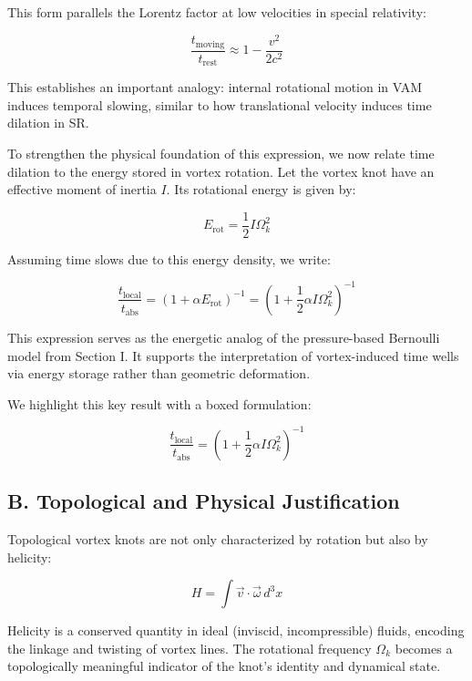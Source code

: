 This form parallels the Lorentz factor at low velocities in special relativity:

\begin{equation}
\frac{t_{\text{moving}}}{t_{\text{rest}}} \approx 1 - \frac{v^2}{2c^2}
\end{equation}

This establishes an important analogy: internal rotational motion in VAM induces temporal slowing, similar to how translational velocity induces time dilation in SR.

To strengthen the physical foundation of this expression, we now relate time dilation to the energy stored in vortex rotation. Let the vortex knot have an effective moment of inertia $I$. Its rotational energy is given by:

\begin{equation}
E_{\text{rot}} = \frac{1}{2} I \Omega_k^2
\end{equation}

Assuming time slows due to this energy density, we write:

\begin{equation}
\frac{t_{\text{local}}}{t_{\text{abs}}} = \left(1 + \alpha E_{\text{rot}} \right)^{-1} = \left(1 + \frac{1}{2} \alpha I \Omega_k^2 \right)^{-1}
\end{equation}

This expression serves as the energetic analog of the pressure-based Bernoulli model from Section I. It supports the interpretation of vortex-induced time wells via energy storage rather than geometric deformation.

We highlight this key result with a boxed formulation:

\begin{equation}
\boxed{\frac{t_{\text{local}}}{t_{\text{abs}}} = \left(1 + \frac{1}{2} \alpha I \Omega_k^2 \right)^{-1}}
\end{equation}

\subsection*{B. Topological and Physical Justification}

Topological vortex knots are not only characterized by rotation but also by helicity:

\begin{equation}
H = \int \vec{v} \cdot \vec{\omega} \, d^3x
\end{equation}

Helicity is a conserved quantity in ideal (inviscid, incompressible) fluids, encoding the linkage and twisting of vortex lines. The rotational frequency $\Omega_k$ becomes a topologically meaningful indicator of the knot’s identity and dynamical state.

